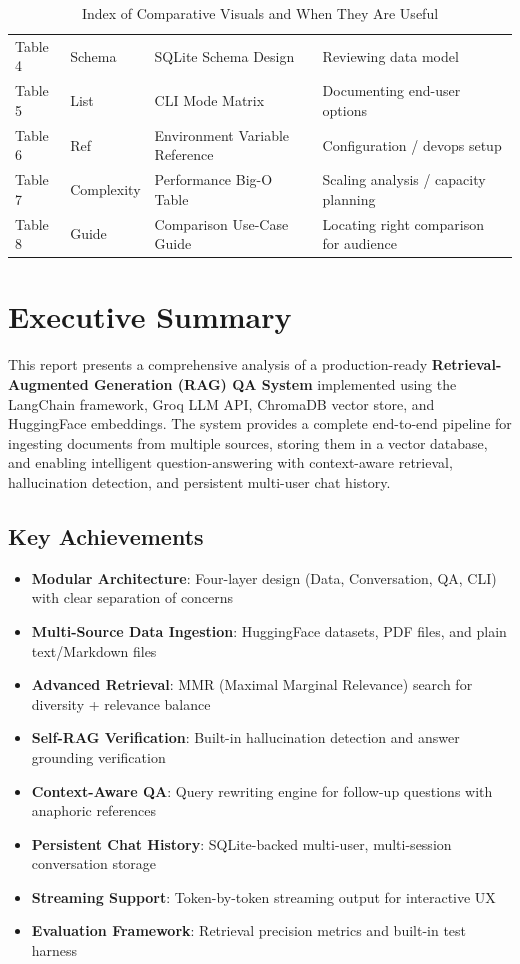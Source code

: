 \documentclass[12pt,a4paper]{article}
\begin{document}
\begin{table}[H]
\begin{tabular}{@{}lllp{4cm}@{}}
Table 4 & Schema & SQLite Schema Design & Reviewing data model \\
Table 5 & List & CLI Mode Matrix & Documenting end-user options \\
Table 6 & Ref & Environment Variable Reference & Configuration / devops setup \\
Table 7 & Complexity & Performance Big-O Table & Scaling analysis / capacity planning \\
Table 8 & Guide & Comparison Use-Case Guide & Locating right comparison for audience \\
\bottomrule
\end{tabular}
\caption{Index of Comparative Visuals and When They Are Useful}
\label{tab:visualsindex}
\end{table}

\newpage

\section{Executive Summary}

This report presents a comprehensive analysis of a production-ready \textbf{Retrieval-Augmented Generation (RAG) QA System} implemented using the LangChain framework, Groq LLM API, ChromaDB vector store, and HuggingFace embeddings. The system provides a complete end-to-end pipeline for ingesting documents from multiple sources, storing them in a vector database, and enabling intelligent question-answering with context-aware retrieval, hallucination detection, and persistent multi-user chat history.

\subsection{Key Achievements}

\begin{itemize}[leftmargin=*]
    \item \textbf{Modular Architecture}: Four-layer design (Data, Conversation, QA, CLI) with clear separation of concerns
    \item \textbf{Multi-Source Data Ingestion}: HuggingFace datasets, PDF files, and plain text/Markdown files
    \item \textbf{Advanced Retrieval}: MMR (Maximal Marginal Relevance) search for diversity + relevance balance
    \item \textbf{Self-RAG Verification}: Built-in hallucination detection and answer grounding verification
    \item \textbf{Context-Aware QA}: Query rewriting engine for follow-up questions with anaphoric references
    \item \textbf{Persistent Chat History}: SQLite-backed multi-user, multi-session conversation storage
    \item \textbf{Streaming Support}: Token-by-token streaming output for interactive UX
    \item \textbf{Evaluation Framework}: Retrieval precision metrics and built-in test harness
\end{itemize}
\end{document}

